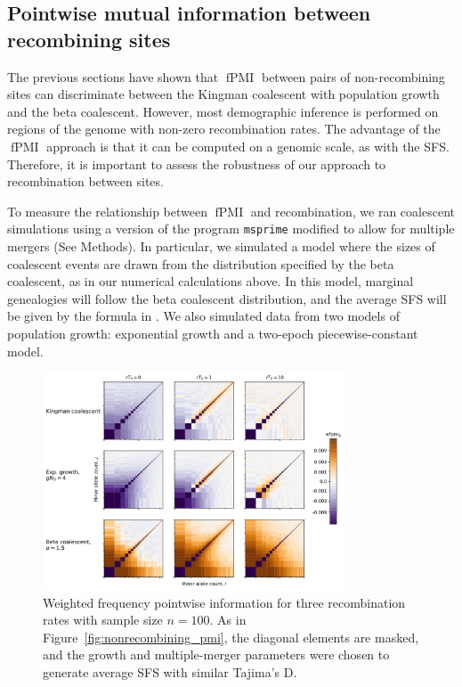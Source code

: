 \documentclass[11pt, letterpaper]{article}   	%
\newcommand{\Fig}[1]{Figure~\ref{#1}}
\DeclareMathOperator{\fpmi}{fPMI}
\begin{document}
\subsection*{Pointwise mutual information between recombining sites}

The previous sections have shown that $\fpmi$ between pairs of non-recombining sites can discriminate between the Kingman coalescent with population growth and the beta coalescent.
However, most demographic inference is performed on regions of the genome with non-zero recombination rates.
The advantage of the $\fpmi$ approach is that it can be computed on a genomic scale, as with the SFS.
Therefore, it is important to assess the robustness of our approach to recombination between sites.

To measure the relationship between $\fpmi$ and recombination, we ran coalescent simulations using a version of the program \texttt{msprime} \cite{KehellerEtAl201?} modified to allow for multiple mergers (See Methods).
In particular, we simulated a model where the sizes of coalescent events are drawn from the distribution specified by the beta coalescent, as in our numerical calculations above.
In this model, marginal genealogies will follow the beta coalescent distribution, and the average SFS will be given by the formula in \cite{BirknerEtAl2013}.
We also simulated data from two models of population growth: exponential growth and a two-epoch piecewise-constant model.

\begin{figure}
\centering
\includegraphics[width=0.8\textwidth]{figures/wfpmi_with_recombination.pdf}
\caption{Weighted frequency pointwise information for three recombination rates with sample size $n=100$. As in \Fig{fig:nonrecombining_pmi}, the diagonal elements are masked, and the growth and multiple-merger parameters were chosen to generate average SFS with similar Tajima's D. \label{fig:wfpmi_recombination}}
\end{figure}
\end{document}
